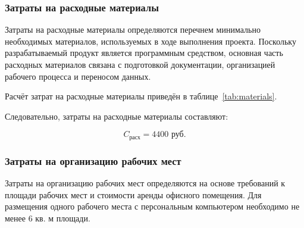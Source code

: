 \subsubsection*{Затраты на расходные материалы}

Затраты на расходные материалы определяются перечнем минимально
необходимых материалов, используемых в ходе выполнения проекта.
Поскольку разрабатываемый продукт является программным средством,
основная часть расходных материалов связана с подготовкой документации,
организацией рабочего процесса и переносом данных.

Расчёт затрат на расходные материалы приведён в
таблице~\ref{tab:materials}.

\begin{table}[h]
\centering
\caption{Затраты на расходные материалы}
\label{tab:materials}
\end{table}

Следовательно, затраты на расходные материалы составляют:

\begin{equation}
C_{\text{расх}} = 4400 \text{ руб.}
\end{equation}

\subsubsection*{Затраты на организацию рабочих мест}

Затраты на организацию рабочих мест определяются на основе требований
к площади рабочих мест и стоимости аренды офисного помещения. Для
размещения одного рабочего места с персональным компьютером
необходимо не менее 6 кв. м площади.

